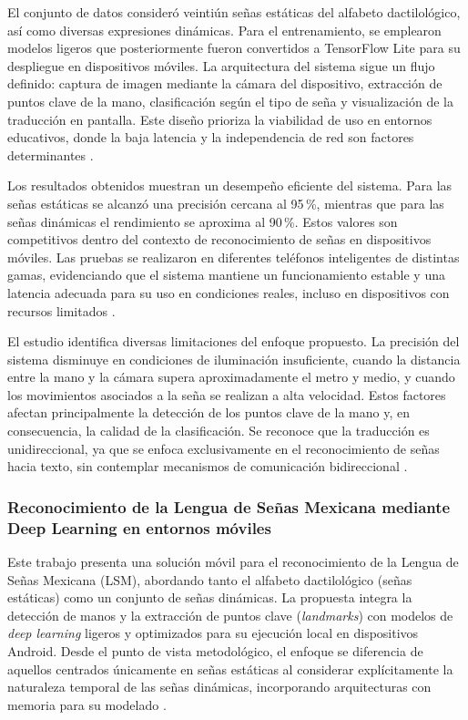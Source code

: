 	El conjunto de datos consideró veintiún señas estáticas del alfabeto dactilológico, así como diversas expresiones dinámicas. Para el entrenamiento, se emplearon modelos ligeros que posteriormente fueron convertidos a TensorFlow Lite para su despliegue en dispositivos móviles. La arquitectura del sistema sigue un flujo definido: captura de imagen mediante la cámara del dispositivo, extracción de puntos clave de la mano, clasificación según el tipo de seña y visualización de la traducción en pantalla. Este diseño prioriza la viabilidad de uso en entornos educativos, donde la baja latencia y la independencia de red son factores determinantes \cite{cuevas2025lsm_app}.
	
	Los resultados obtenidos muestran un desempeño eficiente del sistema. Para las señas estáticas se alcanzó una precisión cercana al 95\,\%, mientras que para las señas dinámicas el rendimiento se aproxima al 90\,\%. Estos valores son competitivos dentro del contexto de reconocimiento de señas en dispositivos móviles. Las pruebas se realizaron en diferentes teléfonos inteligentes de distintas gamas, evidenciando que el sistema mantiene un funcionamiento estable y una latencia adecuada para su uso en condiciones reales, incluso en dispositivos con recursos limitados \cite{cuevas2025lsm_app}.
	
	El estudio identifica diversas limitaciones del enfoque propuesto. La precisión del sistema disminuye en condiciones de iluminación insuficiente, cuando la distancia entre la mano y la cámara supera aproximadamente el metro y medio, y cuando los movimientos asociados a la seña se realizan a alta velocidad. Estos factores afectan principalmente la detección de los puntos clave de la mano y, en consecuencia, la calidad de la clasificación. Se reconoce que la traducción es unidireccional, ya que se enfoca exclusivamente en el reconocimiento de señas hacia texto, sin contemplar mecanismos de comunicación bidireccional \cite{cuevas2025lsm_app}.
	
	\subsubsection{Reconocimiento de la Lengua de Señas Mexicana mediante Deep Learning en entornos móviles}
	
	Este trabajo presenta una solución móvil para el reconocimiento de la Lengua de Señas Mexicana (LSM), abordando tanto el alfabeto dactilológico (señas estáticas) como un conjunto de señas dinámicas. La propuesta integra la detección de manos y la extracción de puntos clave (\textit{landmarks}) con modelos de \textit{deep learning} ligeros y optimizados para su ejecución local en dispositivos Android. Desde el punto de vista metodológico, el enfoque se diferencia de aquellos centrados únicamente en señas estáticas al considerar explícitamente la naturaleza temporal de las señas dinámicas, incorporando arquitecturas con memoria para su modelado \cite{salgado2024lsm_app_dl}.
	
